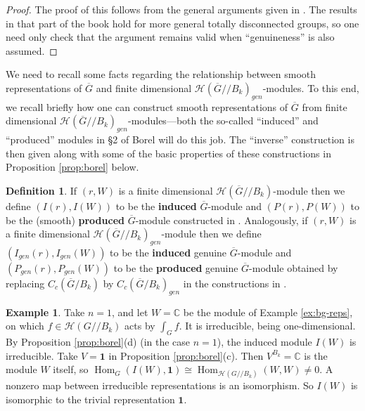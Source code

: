\documentclass[12pt,letterpaper,reqno]{amsart}
\let\cal\mathcal
\theoremstyle{definition}
\newtheorem{definition}[theorem]{Definition}
\newtheorem{example}[theorem]{Example}
\theoremstyle{remark}
\numberwithin{equation}{section}
\begin{document}
\begin{proof}
The proof of this follows from the general arguments given in \cite{Si79}. The
results in that part of the book \cite{Si79} hold for more general totally
disconnected groups, so one need only check that the argument remains valid
when ``genuineness'' is also assumed.
\end{proof}

We need to recall some facts regarding the relationship between smooth
representations of $\overline{G}$ and finite dimensional
${\cal H}(\overline{G}//B_k)_{gen}$-modules. To this end, we recall briefly
how one can construct smooth representations of $\overline{G}$ from finite
dimensional ${\cal H}(\overline{G}//B_k)_{gen}$-modules---both the so-called
``induced'' and ``produced'' modules in \S 2 of Borel \cite{Bo76} will do this
job. The ``inverse'' construction is then given along with some of the basic
properties of these constructions in Proposition \ref{prop:borel} below.

\begin{definition}
\label{def:15}
If $(r,W)$ is a finite dimensional ${\cal H}(\overline{G}//B_k)$-module then
we define $(I(r),I(W))$ to be the \textbf{induced} $\overline{G}$-module and
$(P(r),P(W))$ to be the (smooth) \textbf{produced} $\overline{G}$-module
constructed in \cite{Bo76}. Analogously, if $(r,W)$ is a finite dimensional
${\cal H}(\overline{G}//B_k)_{gen}$-module then we define
$(I_{gen}(r),I_{gen}(W))$ to be the \textbf{induced} genuine
$\overline{G}$-module and $(P_{gen}(r),P_{gen}(W))$ to be the
\textbf{produced} genuine $\overline{G}$-module obtained by replacing
$C_c(\overline{G}/B_k)$ by $C_c(\overline{G}/B_k)_{gen}$ in the constructions
in \cite{Bo76}.
\end{definition}

\begin{example}
\label{ex:def15}
Take $n=1$, and let $W=\mathbb{C}$ be the module of Example \ref{ex:bg-reps},
on which $f\in{\cal H}(G//B_k)$ acts by $\int_Gf$. It is irreducible, being
one-dimensional. By Proposition \ref{prop:borel}(d) (in the case $n=1$), the
induced module $I(W)$ is irreducible. Take $V=\mathbf{1}$ in Proposition
\ref{prop:borel}(c). Then $V^{B_k}=\mathbb{C}$ is the module $W$ itself, so
$\operatorname{Hom}_G(I(W),\mathbf{1})\cong
\operatorname{Hom}_{{\cal H}(G//B_k)}(W,W)\neq 0$. A nonzero map between
irreducible representations is an isomorphism. So $I(W)$ is isomorphic to the
trivial representation $\mathbf{1}$.
\end{example}
\end{document}
